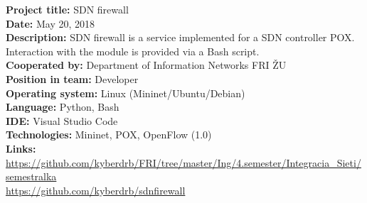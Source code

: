 \documentclass[slovak]{article}
\begin{document}
\noindent
\textbf{Project title:} SDN firewall\\
\textbf{Date:} May 20, 2018\\
\textbf{Description:} SDN firewall is a service implemented for a SDN controller POX. Interaction with the module is provided via a Bash script.\\
\textbf{Cooperated by:} Department of Information Networks FRI ŽU\\
\textbf{Position in team:} Developer\\
\textbf{Operating system:} Linux (Mininet/Ubuntu/Debian)\\
\textbf{Language:} Python, Bash\\
\textbf{IDE:} Visual Studio Code\\
\textbf{Technologies:} Mininet, POX, OpenFlow (1.0)\\
\textbf{Links:}\\
\href{https://github.com/kyberdrb/FRI/tree/master/Ing/4.semester/Integracia\_Sieti/semestralka}{https://github.com/kyberdrb/FRI/tree/master/Ing/4.semester/Integracia\_Sieti/semestralka}\\
\href{https://github.com/kyberdrb/sdnfirewall}{https://github.com/kyberdrb/sdnfirewall}
\end{document}
